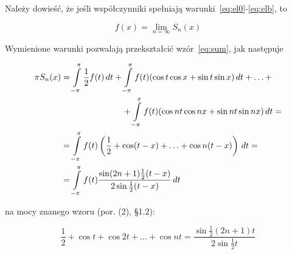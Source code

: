 \documentclass[leqno]{book}
\begin{document}
    Należy dowieść, że jeśli współczynniki spełniają warunki~\eqref{eq:el0}-\eqref{eq:elb}, to

    \begin{equation}
        \label{eq:fS}
        f(x) = \lim_{n = \infty} S_n(x)
    \end{equation}

    Wymienione warunki pozwalają przekształcić wzór~\eqref{eq:sum}, jak następuje

    \begin{gather}
        \begin{align}
            \pi S_n(x) & = \int\limits_{-\pi}^{\pi} \frac{1}{2} f(t) \,dt + \int\limits_{-\pi}^{\pi} f(t)(\cos t \cos x + \sin t \sin x) \,dt +
            \ldots + \\
            & \kern 6pc + \int\limits_{-\pi}^{\pi} f(t)(\cos nt \cos nx + \sin nt \sin nx) \,dt = \notag\\
            & = \int\limits_{-\pi}^{\pi} f(t)\left(\frac{1}{2} + \cos (t -x) + \ldots + \cos n(t - x)\right) \,dt = \notag\\
            & = \int\limits_{-\pi}^{\pi} f(t) \frac{\sin (2n + 1) \frac{1}{2} (t - x)}{2 \sin \frac{1}{2} (t - x)} \,dt \notag
        \end{align}
        \raisetag{3\baselineskip}
    \end{gather}

    na mocy znanego wzoru (por. (2), \S 1.2):

    \[
        \frac{1}{2} + \cos t + \cos 2t + \ldots + \cos nt = \frac{\sin \frac{1}{2} (2n + 1) t}{2 \sin \frac{1}{2} t}
    \]
\end{document}
